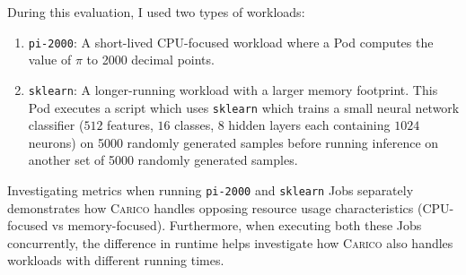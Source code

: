 During this evaluation, I used two types of workloads:
\begin{enumerate}
    \item \texttt{pi-2000}: A short-lived CPU-focused workload where a Pod
        computes the value of $\pi$ to 2000 decimal points.
    \item \texttt{sklearn}: A longer-running workload with a larger memory
        footprint. This Pod executes a script which uses
        \texttt{sklearn} which trains a small neural network classifier ($512$
        features, $16$ classes, $8$ hidden layers each containing $1024$
        neurons) on 5000 randomly generated samples before running inference on
        another set of 5000 randomly generated samples.
\end{enumerate}
Investigating metrics when running \texttt{pi-2000} and \texttt{sklearn} Jobs
separately demonstrates how \textsc{Carico} handles opposing resource usage
characteristics (CPU-focused vs memory-focused). Furthermore, when executing
both these Jobs concurrently, the difference in runtime helps investigate how
\textsc{Carico} also handles workloads with different running times.

%


